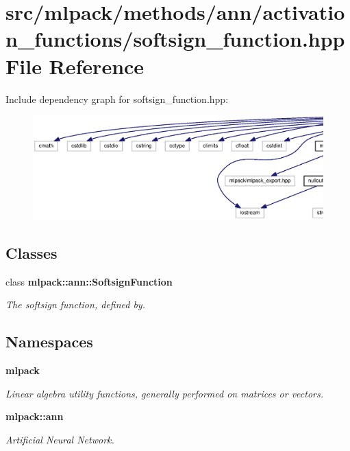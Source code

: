 \section{src/mlpack/methods/ann/activation\+\_\+functions/softsign\+\_\+function.hpp File Reference}
\label{softsign__function_8hpp}
Include dependency graph for softsign\+\_\+function.\+hpp\+:
\nopagebreak
\begin{figure}[H]
\begin{center}
\leavevmode
\includegraphics[width=350pt]{softsign__function_8hpp__incl}
\end{center}
\end{figure}
\subsection*{Classes}
\begin{DoxyCompactItemize}
\item 
class {\bf mlpack\+::ann\+::\+Softsign\+Function}
\begin{DoxyCompactList}\small\item\em The softsign function, defined by. \end{DoxyCompactList}\end{DoxyCompactItemize}
\subsection*{Namespaces}
\begin{DoxyCompactItemize}
\item 
 {\bf mlpack}
\begin{DoxyCompactList}\small\item\em Linear algebra utility functions, generally performed on matrices or vectors. \end{DoxyCompactList}\item 
 {\bf mlpack\+::ann}
\begin{DoxyCompactList}\small\item\em Artificial Neural Network. \end{DoxyCompactList}\end{DoxyCompactItemize}


